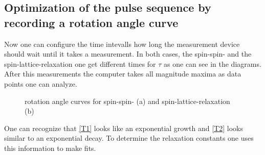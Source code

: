     \subsection{Optimization of the pulse sequence by recording a rotation angle curve}
    \label{task_3}
    Now one can configure the time intevalls how long the measurement device should wait until it takes a measurement. In both cases, the spin-spin- and the spin-lattice-relaxation one get different times for $\tau$ as one can see in the diagrams.
    After this measurements the computer takes all magnitude maxima as data points one can analyze.
           \begin{figure}[h]
               \centering
               \caption{rotation angle curves for spin-spin- (a) and spin-lattice-relaxation (b) }     
           \end{figure}
    One can recognize that \ref{T1} looks like an exponential growth and \ref{T2} looks similar to an exponential decay. To determine the relaxation constants one uses this information to make fits.        
